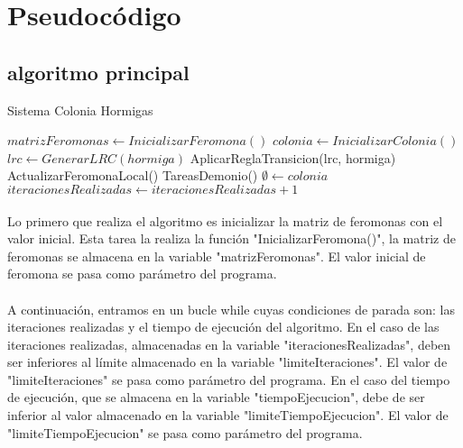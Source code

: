 	\section{Pseudocódigo}
	
	\subsection{algoritmo principal}
	
	\begin{algorithm}[H]
		\caption{Sistema Colonia Hormigas}
		\begin{algorithmic}
			\STATE $matrizFeromonas \leftarrow InicializarFeromona()$
			\STATE $colonia \leftarrow InicializarColonia()$
			\STATE $lrc \leftarrow GenerarLRC(hormiga)$
			\STATE AplicarReglaTransicion(lrc, hormiga)
			\ENDFOR
			\STATE ActualizarFeromonaLocal()
			\ENDFOR
			\STATE TareasDemonio()
			\STATE $\emptyset \leftarrow colonia$
			\STATE $iteracionesRealizadas \leftarrow iteracionesRealizadas+1$
			\ENDWHILE	
		\end{algorithmic}
	\end{algorithm}

	\paragraph{}Lo primero que realiza el algoritmo es inicializar la matriz de feromonas con el valor inicial. Esta tarea la realiza la función "InicializarFeromona()", la matriz de feromonas se almacena en la variable "matrizFeromonas". El valor inicial de feromona se pasa como parámetro del programa.
	
	\paragraph{}A continuación, entramos en un bucle while cuyas condiciones de parada son: las iteraciones realizadas y el tiempo de ejecución del algoritmo. En el caso de las iteraciones realizadas, almacenadas en la variable "iteracionesRealizadas",  deben ser inferiores al límite almacenado en la variable "limiteIteraciones". El valor de "limiteIteraciones" se pasa como parámetro del programa. En el caso del tiempo de ejecución, que se almacena en la variable "tiempoEjecucion", debe de ser inferior al valor almacenado en la variable "limiteTiempoEjecucion". El valor de "limiteTiempoEjecucion" se pasa como parámetro del programa.
	
